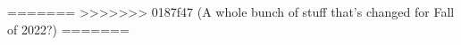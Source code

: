\documentclass{../../oss-apphys-exam}
\begin{document}
\begin{multicols*}{2}
\begin{questions}
\begin{choices}
\begin{choices}
=======
>>>>>>> 0187f47 (A whole bunch of stuff that's changed for Fall of 2022?)
=======

%      
%
%    



\end{choices}
\end{choices}
\end{questions}
\end{multicols*}
\end{document}
